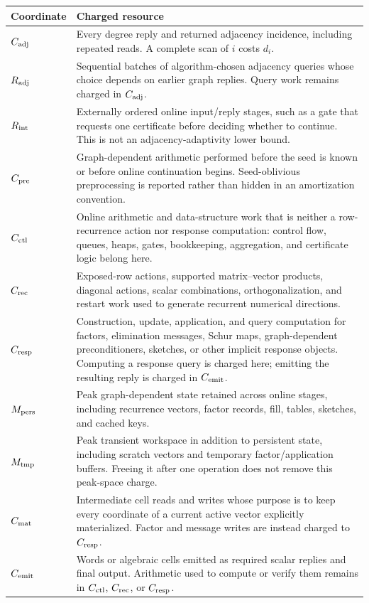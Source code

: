 \begin{center}
\small
\begin{tabularx}{\textwidth}{@{}p{}X@{}}
\toprule
Coordinate & Charged resource \\
\midrule
$C_{\rm adj}$ & Every degree reply and returned adjacency incidence, including
repeated reads.  A complete scan of $i$ costs $d_i$. \\
$R_{\rm adj}$ & Sequential batches of algorithm-chosen adjacency queries whose
choice depends on earlier graph replies.  Query work remains charged in
$C_{\rm adj}$. \\
$R_{\rm int}$ & Externally ordered online input/reply stages, such as a gate
that requests one certificate before deciding whether to continue.  This is
not an adjacency-adaptivity lower bound. \\
$C_{\rm pre}$ & Graph-dependent arithmetic performed before the seed is known
or before online continuation begins.  Seed-oblivious preprocessing is
reported rather than hidden in an amortization convention. \\
$C_{\rm ctl}$ & Online arithmetic and data-structure work that is neither a
row-recurrence action nor response computation: control flow, queues, heaps,
gates, bookkeeping, aggregation, and certificate logic belong here. \\
$C_{\rm rec}$ & Exposed-row actions, supported matrix--vector products,
diagonal actions, scalar combinations, orthogonalization, and restart work
used to generate recurrent numerical directions. \\
$C_{\rm resp}$ & Construction, update, application, and query computation for
factors, elimination messages, Schur maps, graph-dependent preconditioners,
sketches, or other implicit response objects.  Computing a response query is
charged here; emitting the resulting reply is charged in $C_{\rm emit}$. \\
$M_{\rm pers}$ & Peak graph-dependent state retained across online stages,
including recurrence vectors, factor records, fill, tables, sketches, and
cached keys. \\
$M_{\rm tmp}$ & Peak transient workspace in addition to persistent state,
including scratch vectors and temporary factor/application buffers.  Freeing
it after one operation does not remove this peak-space charge. \\
$C_{\rm mat}$ & Intermediate cell reads and writes whose purpose is to keep
every coordinate of a current active vector explicitly materialized.  Factor
and message writes are instead charged to $C_{\rm resp}$. \\
$C_{\rm emit}$ & Words or algebraic cells emitted as required scalar replies
and final output.  Arithmetic used to compute or verify them remains in
$C_{\rm ctl}$, $C_{\rm rec}$, or $C_{\rm resp}$. \\
\bottomrule
\end{tabularx}
\end{center}


